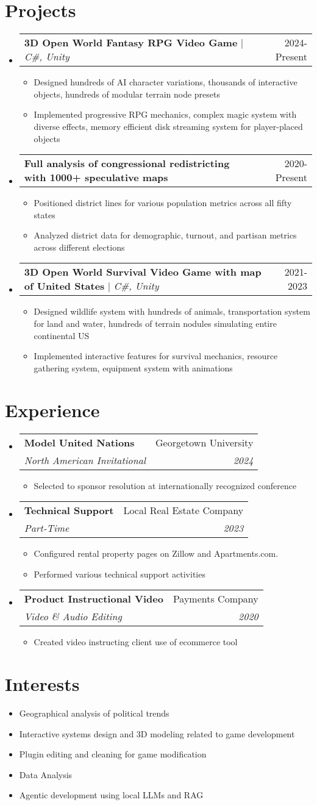 \documentclass[letterpaper,11pt]{article}
\makeatletter
\newcommand{\resumeItem}[1]{ 
  \item\small{\parbox[t]{0.8\textwidth}{#1} \vspace{-2pt}} 
  }
\newcommand{\resumeItemLongLines}[1]{ 
  \item\small{\parbox[t]{0.8\textwidth}{#1} \vspace{2pt}} 
  }
\newcommand{\resumeSubheading}[4]{ 
  \vspace{-2pt}\item 
  \begin{tabular*}{0.97\textwidth}[t]{l@{\extracolsep{\fill}}r} 
    \textbf{#1} & #2 \\ 
    \textit{\small#3} & \textit{\small #4} \\ 
  \end{tabular*}\vspace{-7pt} 
}
\newcommand{\resumeProjectHeading}[2]{ 
  \item 
  \begin{tabular*}{0.97\textwidth}[t]{l@{\extracolsep{\fill}}r} 
    \small#1 & #2 \\ 
  \end{tabular*}\vspace{-7pt} 
}
\newcommand{\resumeSubHeadingListStart}{\begin{itemize}[leftmargin=0.15in, label={}]}
\newcommand{\resumeSubHeadingListEnd}{\end{itemize}}
\newcommand{\resumeItemListStart}{\begin{itemize}[leftmargin=0.15in, label={}]}
\newcommand{\resumeItemListEnd}{\end{itemize}\vspace{-5pt}}
\makeatother
\begin{document}
\section{Projects} 
  \resumeSubHeadingListStart 
    \resumeProjectHeading 
      {\textbf{3D Open World Fantasy RPG Video Game} $|$ \emph{C\#, Unity}}{2024-Present} 
      \resumeItemListStart 
        \resumeItemLongLines{Designed hundreds of AI character variations, thousands of interactive objects, hundreds of modular terrain node presets} 
        \resumeItem{Implemented progressive RPG mechanics, complex magic system with diverse effects, memory efficient disk streaming system for player-placed objects} 
      \resumeItemListEnd 
    \resumeProjectHeading 
      {\textbf{Full analysis of congressional redistricting with 1000+ speculative maps} \emph{}}{2020-Present} 
      \resumeItemListStart 
        \resumeItemLongLines{Positioned district lines for various population metrics across all fifty states} 
        \resumeItem{Analyzed district data for demographic, turnout, and partisan metrics across different elections} 
      \resumeItemListEnd 
    \resumeProjectHeading 
      {\textbf{3D Open World Survival Video Game with map of United States} $|$ \emph{C\#, Unity}}{2021-2023} 
      \resumeItemListStart 
        \resumeItemLongLines{Designed wildlife system with hundreds of animals, transportation system for land and water, hundreds of terrain nodules simulating entire continental US} 
        \resumeItem{Implemented interactive features for survival mechanics, resource gathering system, equipment system with animations} 
      \resumeItemListEnd 
  \resumeSubHeadingListEnd 

\section{Experience} 
  \resumeSubHeadingListStart 
    \resumeSubheading 
      {Model United Nations}{Georgetown University} 
      {North American Invitational}{2024} 
      \resumeItemListStart 
        \resumeItem{Selected to sponsor resolution at internationally recognized conference} 
      \resumeItemListEnd 
    \resumeSubheading 
      {Technical Support}{Local Real Estate Company} 
      {Part-Time}{2023} 
      \resumeItemListStart 
        \resumeItem{Configured rental property pages on Zillow and Apartments.com. } 
        \resumeItem{Performed various technical support activities} 
      \resumeItemListEnd 
    \resumeSubheading 
      {Product Instructional Video}{Payments Company} 
      {Video \& Audio Editing}{2020} 
      \resumeItemListStart 
        \resumeItem{Created video instructing client use of ecommerce tool} 
      \resumeItemListEnd 
  \resumeSubHeadingListEnd 

\section{Interests} 
  \resumeItemListStart 
    \resumeItem{Geographical analysis of political trends} 
    \resumeItem{Interactive systems design and 3D modeling related to game development} 
    \resumeItem{Plugin editing and cleaning for game modification} 
    \resumeItem{Data Analysis} 
    \resumeItem{Agentic development using local LLMs and RAG}
  \resumeItemListEnd 
\end{document}
